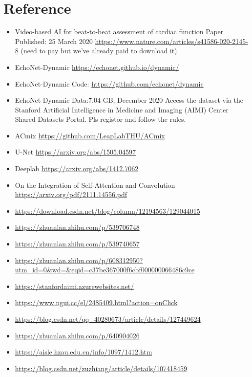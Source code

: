 \section{Reference}

\begin{itemize}
  \item Video-based AI for beat-to-beat assessment of cardiac function 
Paper Published: 25 March 2020
\url{https://www.nature.com/articles/s41586-020-2145-8} (need to pay but we've already paid to download it)
  \item EchoNet-Dynamic \url{https://echonet.github.io/dynamic/}
  \item EchoNet-Dynamic Code: \url{https://github.com/echonet/dynamic}
  \item EchoNet-Dynamic	 Data:7.04 GB, December 2020
Access the dataset via the Stanford Artificial Intelligence in Medicine and Imaging (AIMI) Center Shared Datasets Portal. Pls registor and follow the rules.
  \item ACmix  \url{https://github.com/LeapLabTHU/ACmix}
  \item U-Net \url{https://arxiv.org/abs/1505.04597}
  \item Deeplab \url{https://arxiv.org/abs/1412.7062}
  \item On the Integration of Self-Attention and Convolution  \url{https://arxiv.org/pdf/2111.14556.pdf}
  \item \url{https://download.csdn.net/blog/column/12194563/129044015}
  \item \url{https://zhuanlan.zhihu.com/p/539706748}
  \item \url{https://zhuanlan.zhihu.com/p/539740657}
  \item \url{https://zhuanlan.zhihu.com/p/608312950?utm_id=0&wd=&eqid=c37be367000f6cbf000000066486c9ce}
  \item \url{https://stanfordaimi.azurewebsites.net/}
  \item \url{https://www.ngui.cc/el/2485409.html?action=onClick}
  \item \url{https://blog.csdn.net/qq_40280673/article/details/127449624}
  \item \url{https://zhuanlan.zhihu.com/p/640904026}
  \item \url{https://aisle.hzau.edu.cn/info/1097/1412.htm}
  \item \url{https://blog.csdn.net/zuzhiang/article/details/107418459}
\end{itemize}
